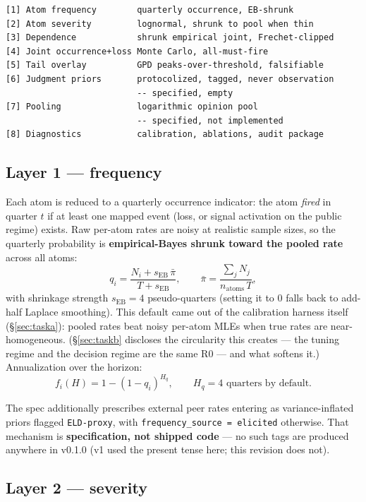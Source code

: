 \documentclass[11pt]{article}
\begin{document}
\begin{verbatim}
[1] Atom frequency        quarterly occurrence, EB-shrunk
[2] Atom severity         lognormal, shrunk to pool when thin
[3] Dependence            shrunk empirical joint, Frechet-clipped
[4] Joint occurrence+loss Monte Carlo, all-must-fire
[5] Tail overlay          GPD peaks-over-threshold, falsifiable
[6] Judgment priors       protocolized, tagged, never observation
                          -- specified, empty
[7] Pooling               logarithmic opinion pool
                          -- specified, not implemented
[8] Diagnostics           calibration, ablations, audit package
\end{verbatim}

\subsection{Layer 1 --- frequency}
\label{sec:frequency}

Each atom is reduced to a quarterly occurrence indicator: the atom
\emph{fired} in quarter $t$ if at least one mapped event (loss, or signal
activation on the public regime) exists. Raw per-atom rates are noisy at
realistic sample sizes, so the quarterly probability is
\textbf{empirical-Bayes shrunk toward the pooled rate} across all atoms:
\[
q_i = \frac{N_i + s_{\mathrm{EB}}\,\bar\pi}{T + s_{\mathrm{EB}}},
\qquad
\bar\pi = \frac{\sum_j N_j}{n_{\mathrm{atoms}}\,T},
\]
with shrinkage strength $s_{\mathrm{EB}} = 4$ pseudo-quarters (setting it to
0 falls back to add-half Laplace smoothing). This default came out of the
calibration harness itself (\S\ref{sec:taska}): pooled rates beat noisy
per-atom MLEs when true rates are near-homogeneous. (\S\ref{sec:taskb}
discloses the circularity this creates --- the tuning regime and the
decision regime are the same R0 --- and what softens it.) Annualization over
the horizon:
\[
f_i(H) = 1 - (1 - q_i)^{H_q}, \qquad H_q = 4 \text{ quarters by default}.
\]

The spec additionally prescribes external peer rates entering as
variance-inflated priors flagged \texttt{ELD-proxy}, with
\texttt{frequency\_source = elicited} otherwise. That mechanism is
\textbf{specification, not shipped code} --- no such tags are produced
anywhere in v0.1.0 (v1 used the present tense here; this revision does not).

\subsection{Layer 2 --- severity}
\label{sec:severity}
\end{document}

